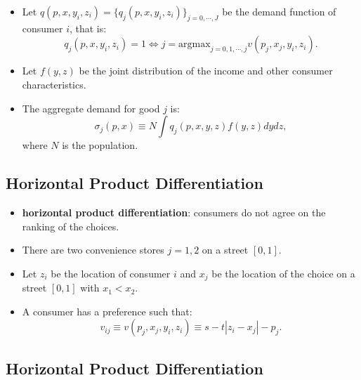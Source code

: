 \documentclass[
]{book}
\providecommand{\tightlist}{%
  \setlength{\itemsep}{0pt}\setlength{\parskip}{0pt}}
\begin{document}
\begin{itemize}
\tightlist
\item
  Let \(q(p, x, y_i, z_i) = \{q_j(p, x, y_i, z_i)\}_{j = 0, \cdots, J}\) be the demand function of consumer \(i\), that is:
  \begin{equation}
  q_j(p, x, y_i, z_i) = 1 \Leftrightarrow j = \text{argmax}_{j = 0, 1, \cdots, j}  v(p_j, x_j, y_i, z_i).
  \end{equation}
\item
  Let \(f(y, z)\) be the joint distribution of the income and other consumer characteristics.
\item
  The aggregate demand for good \(j\) is:
  \begin{equation}
  \sigma_j(p, x) \equiv N \int  q_j(p, x, y, z) f(y, z) dy dz,
  \end{equation}
  where \(N\) is the population.
\end{itemize}

\hypertarget{horizontal-product-differentiation}{%
\subsection{Horizontal Product Differentiation}\label{horizontal-product-differentiation}}

\begin{itemize}
\tightlist
\item
  \textbf{horizontal product differentiation}: consumers do not agree on the ranking of the choices.
\item
  There are two convenience stores \(j = 1, 2\) on a street \([0, 1]\).
\item
  Let \(z_i\) be the location of consumer \(i\) and \(x_j\) be the location of the choice on a street \([0, 1]\) with \(x_1 < x_2\).
\item
  A consumer has a preference such that:
  \begin{equation}
  v_{ij} \equiv v(p_j, x_j, y_i, z_i) \equiv s - t |z_i - x_j| - p_j.
  \end{equation}
\end{itemize}

\hypertarget{horizontal-product-differentiation-1}{%
\subsection{Horizontal Product Differentiation}\label{horizontal-product-differentiation-1}}
\end{document}
